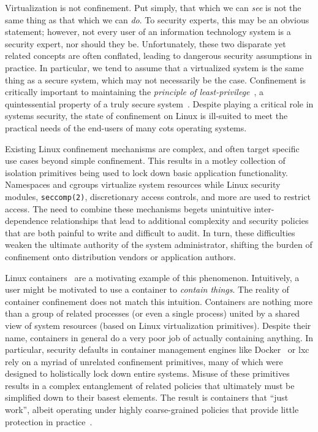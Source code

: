 Virtualization is not confinement. Put simply, that which we can \textit{see} is not the
same thing as that which we can \textit{do}. To security experts, this may be an obvious
statement; however, not every user of an information technology system is a security
expert, nor should they be. Unfortunately, these two disparate yet related concepts are
often conflated, leading to dangerous security assumptions in practice. In particular, we
tend to assume that a virtualized system is the same thing as a secure system, which may
not necessarily be the case. Confinement is critically important to maintaining the
\textit{principle of least-privilege}~\cite{schneider03_least_privilege}, a quintessential
property of a truly secure system~\cite{van_oorschot2020_tools_jewels}. Despite playing
a critical role in systems security, the state of confinement on Linux is ill-suited to
meet the practical needs of the end-users of many \gls{cots} operating systems.

Existing Linux confinement mechanisms are complex, and often target specific use cases
beyond simple confinement. This results in a motley collection of isolation primitives
being used to lock down basic application functionality. Namespaces and cgroups virtualize
system resources while Linux security modules, \texttt{seccomp(2)}, discretionary access
controls, and more are used to restrict access. The need to combine these mechanisms
begets unintuitive inter-dependence relationships that lead to additional complexity and
security policies that are both painful to write and difficult to audit. In turn, these
difficulties weaken the ultimate authority of the system administrator, shifting the
burden of confinement onto distribution vendors or application authors.

Linux containers~\cite{docker_security, lxc_security, lin2018_container_security,
sultan2019_container_security} are a motivating example of this phenomenon. Intuitively,
a user might be motivated to use a container to \textit{contain things}. The reality of
container confinement does not match this intuition. Containers are nothing more than
a group of related processes (or even a single process) united by a shared view of system
resources (based on Linux virtualization primitives). Despite their name, containers in
general do a very poor job of actually containing anything. In particular, security
defaults in container management engines like Docker~\cite{docker_security} or
\gls{lxc}~\cite{lxc_security} rely on a myriad of unrelated confinement primitives, many
of which were designed to holistically lock down entire systems. Misuse of these
primitives results in a complex entanglement of related policies that ultimately must be
simplified down to their basest elements. The result is containers that \enquote{just
work}, albeit operating under highly coarse-grained policies that provide little
protection in practice~\cite{sultan2019_container_security, lin2018_container_security}.

